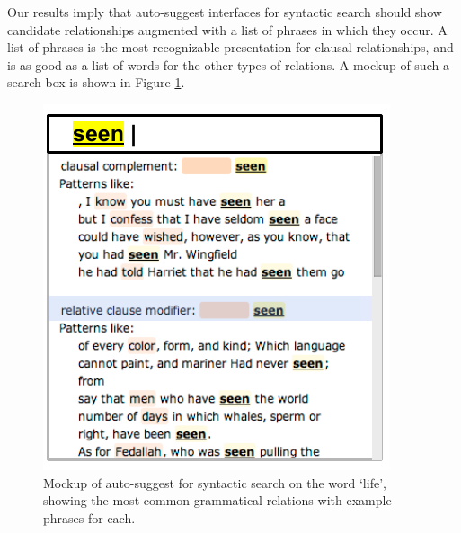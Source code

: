 Our results imply that auto-suggest interfaces for syntactic search should show candidate relationships augmented with a list of phrases in which they occur. A list of phrases is the most recognizable presentation for clausal relationships, and is as good as a list of words for the other types of relations. A mockup of such a search box is shown in Figure \ref{fig:phrases-mockup}.
\begin{figure}
\centering
\includegraphics[width=0.5\columnwidth]{fig/phrases-mockup}
\caption{
	\label{fig:phrases-mockup} Mockup of auto-suggest for syntactic search on the word `life', showing the most common grammatical relations with example phrases for each.
}
\end{figure}

